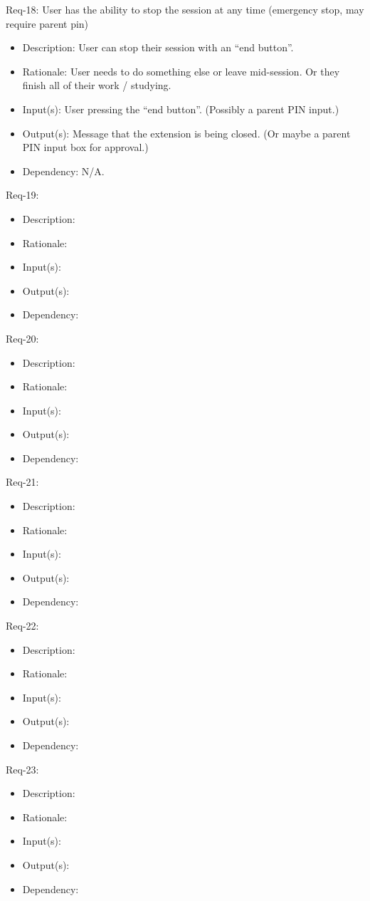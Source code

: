 \documentclass[12pt]{article}
\begin{document}
Req-18: User has the ability to stop the session at any time (emergency stop, may require parent pin) 
\begin{itemize}
    \item Description: User can stop their session with an “end button”.
    \item Rationale: User needs to do something else or leave mid-session. Or they finish all of their work / studying.
    \item Input(s): User pressing the “end button”. (Possibly a parent PIN input.)
    \item Output(s): Message that the extension is being closed. (Or maybe a parent PIN input box for approval.)
    \item Dependency: N/A.
\end{itemize}
Req-19: 
\begin{itemize}
    \item Description: 
    \item Rationale: 
    \item Input(s): 
    \item Output(s): 
    \item Dependency: 
\end{itemize}
Req-20: 
\begin{itemize}
    \item Description: 
    \item Rationale: 
    \item Input(s): 
    \item Output(s): 
    \item Dependency: 
\end{itemize}
Req-21: 
\begin{itemize}
    \item Description: 
    \item Rationale: 
    \item Input(s): 
    \item Output(s): 
    \item Dependency: 
\end{itemize}
Req-22:  
\begin{itemize}
    \item Description: 
    \item Rationale: 
    \item Input(s): 
    \item Output(s): 
    \item Dependency: 
\end{itemize}
Req-23:  
\begin{itemize}
    \item Description: 
    \item Rationale: 
    \item Input(s): 
    \item Output(s): 
    \item Dependency: 
\end{itemize}
\end{document}
